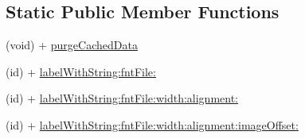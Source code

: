 \subsection*{Static Public Member Functions}
\begin{DoxyCompactItemize}
\item 
(void) + \hyperlink{interface_c_c_label_b_m_font_a217a423c2f92caac23cc863f5491ab41}{purge\-Cached\-Data}
\item 
(id) + \hyperlink{interface_c_c_label_b_m_font_a45cd1ad47086a694ce12df50a86c1cfe}{label\-With\-String\-:fnt\-File\-:}
\item 
(id) + \hyperlink{interface_c_c_label_b_m_font_aba650fc9f18e621bc31c5a2bcf536e28}{label\-With\-String\-:fnt\-File\-:width\-:alignment\-:}
\item 
(id) + \hyperlink{interface_c_c_label_b_m_font_af20fc5d0f9bb76b72a4ecd5a68a6a511}{label\-With\-String\-:fnt\-File\-:width\-:alignment\-:image\-Offset\-:}
\end{DoxyCompactItemize}
